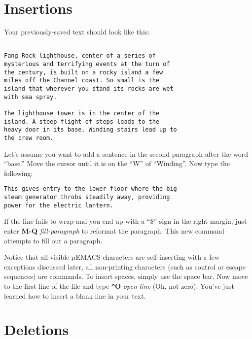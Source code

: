 \section{Insertions}

Your previously-saved text should look like this:

\begin{verbatim}

Fang Rock lighthouse, center of a series of
mysterious and terrifying events at the turn of
the century, is built on a rocky island a few
miles off the Channel coast. So small is the
island that wherever you stand its rocks are wet
with sea spray.

The lighthouse tower is in the center of the
island. A steep flight of steps leads to the
heavy door in its base. Winding stairs lead up to
the crew room.

\end{verbatim}

Let's assume you want to add a sentence in the second paragraph after
the word ``base.'' Move the cursor until it is on the ``W'' of
``Winding''. Now type the following:

\begin{verbatim}
This gives entry to the lower floor where the big
steam generator throbs steadily away, providing
power for the electric lantern.
\end{verbatim}

If the line fails to wrap and you end up with a ``\$'' sign in the right
margin, just enter {\bf M-Q} {\it fill-paragraph} to reformat the
paragraph. This new command attempts to fill out a paragraph. 

Notice that all visible $\mu$EMACS characters are self-inserting with a
few exceptions discussed later, all non-printing characters (such as
control or escape sequences) are commands. To insert spaces, simply use
the space bar. Now move to the first line of the file and type {\bf
\verb+^+O} {\it open-line} (Oh, not zero). You've just learned how to
insert a blank line in your text.

\section{Deletions}

